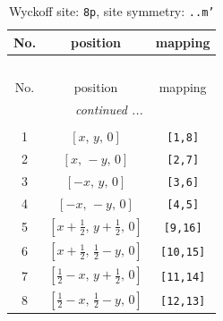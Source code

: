 \documentclass[fleqn,8pt]{jsarticle}
\begin{document}
\begin{longtable}{ccc}
\caption{Wyckoff site: {\tt 8p}, site symmetry: {\tt ..m'}}
 \\
 \hline \hline
No. & position & mapping \\ \hline \endfirsthead

\multicolumn{2}{l}{\tablename\ \thetable{}} \\
 \hline \hline
No. & position & mapping \\ \hline \endhead

 \hline \hline
\multicolumn{2}{r}{\footnotesize\it continued ...} \\ \endfoot

 \hline \hline
\multicolumn{2}{r}{} \\ \endlastfoot

1 & $\left[ x,\, y,\, 0 \right]$ & {\tt [1,8]} \\ \hline
2 & $\left[ x,\, - y,\, 0 \right]$ & {\tt [2,7]} \\ \hline
3 & $\left[ - x,\, y,\, 0 \right]$ & {\tt [3,6]} \\ \hline
4 & $\left[ - x,\, - y,\, 0 \right]$ & {\tt [4,5]} \\ \hline
5 & $\left[ x + \frac{1}{2},\, y + \frac{1}{2},\, 0 \right]$ & {\tt [9,16]} \\ \hline
6 & $\left[ x + \frac{1}{2},\, \frac{1}{2} - y,\, 0 \right]$ & {\tt [10,15]} \\ \hline
7 & $\left[ \frac{1}{2} - x,\, y + \frac{1}{2},\, 0 \right]$ & {\tt [11,14]} \\ \hline
8 & $\left[ \frac{1}{2} - x,\, \frac{1}{2} - y,\, 0 \right]$ & {\tt [12,13]} \\
\end{longtable}
\renewcommand{\arraystretch}{1.2}
\end{document}
